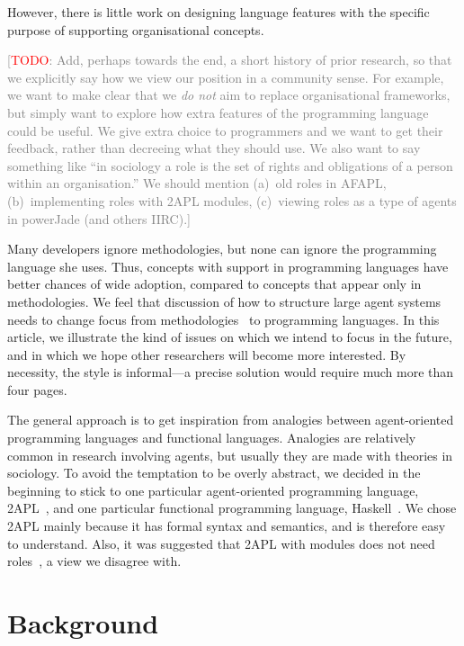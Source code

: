 \documentclass[conference,compsoc]{IEEEtran} %
\newcommand{\todo}[1]{{\small \textcolor{gray}{[\textcolor{red}{TODO}: #1]}}}
\begin{document}
However, there is little work on designing language features with the
specific purpose of supporting organisational concepts.

\todo{Add, perhaps towards the end, a short history of prior research, so
that we explicitly say how we view our position in a community sense. For
example, we want to make clear that we \emph{do not} aim to replace
organisational frameworks, but simply want to explore how extra features of
the programming language could be useful. We give extra choice to
programmers and we want to get their feedback, rather than decreeing what
they should use.  We also want to say something like ``in sociology a role
is the set of rights and obligations of a person within an organisation.''
We should mention (a)~old roles in AFAPL, (b)~implementing roles with 2APL
modules, (c)~viewing roles as a type of agents in powerJade (and others
IIRC).}

Many developers ignore methodologies, but none can ignore the programming
language she uses. Thus, concepts with support in programming languages
have better chances of wide adoption, compared to concepts that appear only
in methodologies. We feel that discussion of how to structure large agent
systems needs to change focus from
methodologies~\cite{dblp:conf/aose/ferbergm03} to programming languages.
In this article, we illustrate the kind of issues on which we intend to
focus in the future, and in which we hope other researchers will become
more interested. By necessity, the style is informal---a precise solution
would require much more than four pages.

The general approach is to get inspiration from analogies between
agent-oriented programming languages and functional languages. Analogies
are relatively common in research involving agents, but usually they are
made with theories in sociology. To avoid the temptation to be overly
abstract, we decided in the beginning to stick to one particular
agent-oriented programming language,
2APL~\cite{DBLP:journals/aamas/Dastani08}, and one particular functional
programming language, Haskell~\cite{web:haskell}. We chose 2APL mainly
because it has formal syntax and semantics, and is therefore easy to
understand. Also, it was suggested that 2APL with modules does not need
roles~\cite{dblp:conf/prima/dastanims08}, a view we disagree with.

\section{Background} %
\end{document}
